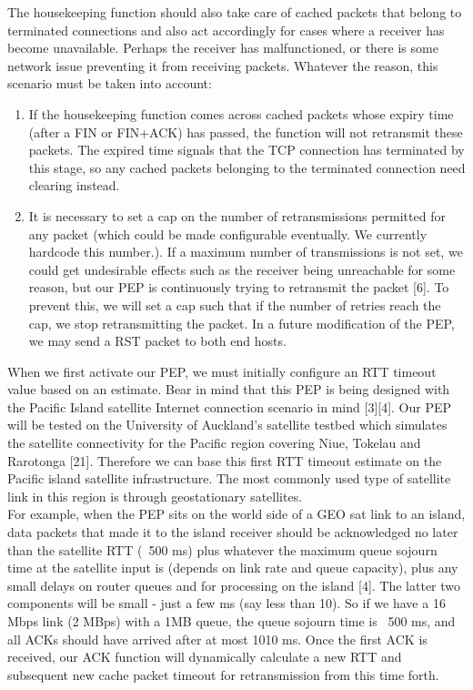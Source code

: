 \documentclass{uathesis}
\begin{document}
\noindent The housekeeping function should also take care of cached packets that belong to terminated connections and also act accordingly for cases where a receiver has become unavailable. Perhaps the receiver has malfunctioned, or there is some network issue preventing it from receiving packets. Whatever the reason, this scenario must be taken into account:  \\ 

\begin{enumerate}
\item If the housekeeping function comes across cached packets whose expiry time (after a FIN or FIN+ACK) has passed, the function will not retransmit these packets. The expired time signals that the TCP connection has terminated by this stage, so any cached packets belonging to the terminated connection need clearing instead.\\
\item It is necessary to set a cap on the number of retransmissions permitted for any packet (which could be made configurable eventually. We currently hardcode this number.). If a maximum number of transmissions is not set, we could get undesirable effects such as the receiver being unreachable for some reason, but our PEP is continuously trying to retransmit the packet [6]. To prevent this, we will set a cap such that if the number of retries reach the cap, we stop retransmitting the packet. In a future modification of the PEP, we may send a RST packet to both end hosts.\\
\end{enumerate}

When we first activate our PEP, we must initially configure an RTT timeout value based on an estimate. Bear in mind that this PEP is being designed with the Pacific Island satellite Internet connection scenario in mind [3][4]. Our PEP will be tested on the University of Auckland's satellite testbed which simulates the satellite connectivity for the Pacific region covering Niue, Tokelau and Rarotonga [21]. Therefore we can base this first RTT timeout estimate on the Pacific island satellite infrastructure. The most commonly used type of satellite link in this region is through geostationary satellites.\\

For example, when the PEP sits on the world side of a GEO sat link to an island, data packets that made it to the island receiver should be acknowledged no later than the satellite RTT (~500 ms) plus whatever the maximum queue sojourn time at the satellite input is (depends on link rate and queue capacity), plus any small delays on router queues and for processing on the island [4]. The latter two components will be small - just a few ms (say less than 10). So if we have a 16 Mbps link (2 MBps) with a 1MB queue, the queue sojourn time is ~500 ms, and all ACKs should have arrived after at most 1010 ms. Once the first ACK is received, our ACK function will dynamically calculate a new RTT and subsequent new cache packet timeout for retransmission from this time forth.\\
\end{document}

